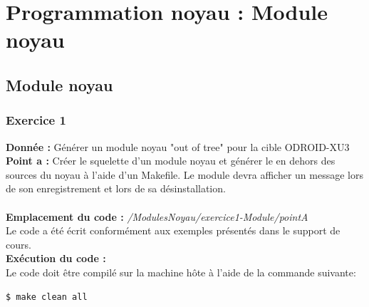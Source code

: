 \newpage
\section{Programmation noyau : Module noyau}
\subsection{Module noyau}
\subsubsection{Exercice 1}
\textbf{Donnée : } Générer un module noyau "out of tree" pour la cible ODROID-XU3\\
\textbf{Point a :} Créer	le	squelette	d’un	module	noyau	et	générer	le	en	dehors	des	sources	du	noyau	à	l’aide	d’un	Makefile.	Le	module	devra	afficher	un	message	lors	de	son	enregistrement	et	lors	de	sa	désinstallation.\\\\
\textbf{Emplacement du code : } \textit{/ModulesNoyau/exercice1-Module/pointA}\\
Le code a été écrit conformément aux exemples présentés dans le support de cours.\\

\textbf{Exécution du code : } \\
Le code doit être compilé sur la machine hôte à l'aide de la commande suivante:
\begin{lstlisting}
$ make clean all
\end{lstlisting}

